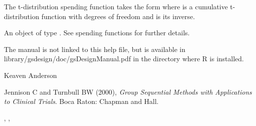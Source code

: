 \begin{Details}\relax
The t-distribution spending function takes the form
where  is a cumulative t-distribution function with  degrees of freedom
and  is its inverse.
\end{Details}
\begin{Value}
An object of type . See spending functions for further details.
\end{Value}
\begin{Note}\relax
The manual is not linked to this help file, but is available in library/gsdesign/doc/gsDesignManual.pdf
in the directory where R is installed.
\end{Note}
\begin{Author}\relax
Keaven Anderson 
\end{Author}
\begin{References}\relax
Jennison C and Turnbull BW (2000), \emph{Group Sequential Methods with Applications to Clinical Trials}.
Boca Raton: Chapman and Hall.
\end{References}
\begin{SeeAlso}\relax
{}, , 
\end{SeeAlso}
